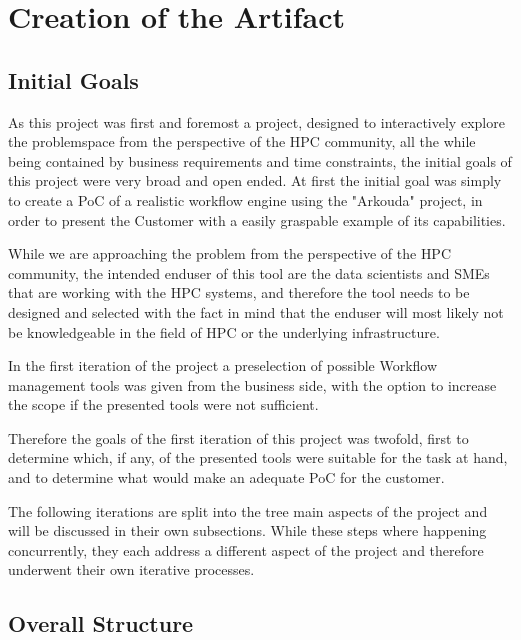 \chapter{Creation of the Artifact}
\label{creation_of_the_artifact}

\section{Initial Goals}
\label{artefact_inital_goals}

As this project was first and foremost a project, designed to interactively explore the problemspace from the perspective of the \ac{HPC} community, 
all the while being contained by business requirements and time constraints, the initial goals of this project were very broad and open ended. 
At first the initial goal was simply to create a \ac{PoC} of a realistic workflow engine using the "Arkouda" project,
in order to present the Customer with a easily graspable example of its capabilities.

While we are approaching the problem from the perspective of the \ac{HPC} community, the intended enduser of this tool are the data scientists and \ac{SME}s 
that are working with the \ac{HPC} systems, and therefore the tool needs to be designed and selected with the fact in mind that the enduser will most likely not be knowledgeable in the field of \ac{HPC} or the underlying infrastructure.

In the first iteration of the project a preselection of possible Workflow management tools was given from the business side,
with the option to increase the scope if the presented tools were not sufficient.

Therefore the goals of the first iteration of this project was twofold, first to determine which, if any, of the presented tools were suitable for the task at hand,
and to determine what would make an adequate \ac{PoC} for the customer.

The following iterations are split into the tree main aspects of the project and will be discussed in their own subsections.
While these steps where happening concurrently, they each address a different aspect of the project and therefore underwent their own iterative processes.


\newpage 


\section{Overall Structure}
 
